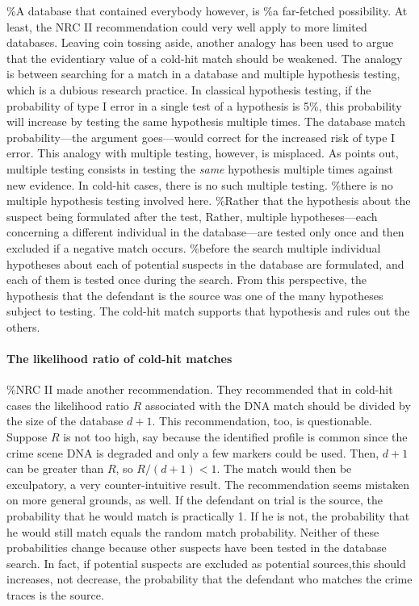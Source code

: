 \documentclass[10pt,dvipsnames,enabledeprecatedfontcommands]{scrartcl}
\let\oldparagraph\paragraph
\renewcommand{\paragraph}[1]{\oldparagraph{#1}\mbox{}}
\begin{document}
\%A database that contained everybody however, is \%a far-fetched
possibility. At least, the NRC II recommendation could very well apply
to more limited databases. Leaving coin tossing aside, another analogy
has been used to argue that the evidentiary value of a cold-hit match
should be weakened. The analogy is between searching for a match in a
database and multiple hypothesis testing, which is a dubious research
practice. In classical hypothesis testing, if the probability of type I
error in a single test of a hypothesis is 5\%, this probability will
increase by testing the same hypothesis multiple times. The database
match probability---the argument goes---would correct for the increased
risk of type I error. This analogy with multiple testing, however, is
misplaced. As \citet{balding2002DNDatabaseSearch} points out, multiple
testing consists in testing the \textit{same} hypothesis multiple times
against new evidence. In cold-hit cases, there is no such multiple
testing. \%there is no multiple hypothesis testing involved here.
\%Rather that the hypothesis about the suspect being formulated after
the test, Rather, multiple hypotheses---each concerning a different
individual in the database---are tested only once and then excluded if a
negative match occurs. \%before the search multiple individual
hypotheses about each of potential suspects in the database are
formulated, and each of them is tested once during the search. From this
perspective, the hypothesis that the defendant is the source was one of
the many hypotheses subject to testing. The cold-hit match supports that
hypothesis and rules out the others.

\paragraph{The likelihood ratio of cold-hit matches}

\%NRC II made another recommendation. They recommended that in cold-hit
cases the likelihood ratio \(R\) associated with the DNA match should be
divided by the size of the database \(d+1\). This recommendation, too,
is questionable. Suppose \(R\) is not too high, say because the
identified profile is common since the crime scene DNA is degraded and
only a few markers could be used. Then, \(d+1\) can be greater than
\(R\), so \(R/(d+1)<1\). The match would then be exculpatory, a very
counter-intuitive result. The recommendation seems mistaken on more
general grounds, as well. If the defendant on trial is the source, the
probability that he would match is practically 1. If he is not, the
probability that he would still match equals the random match
probability. Neither of these probabilities change because other
suspects have been tested in the database search. In fact, if potential
suspects are excluded as potential sources,this should increases, not
decrease, the probability that the defendant who matches the crime
traces is the source.
\end{document}
